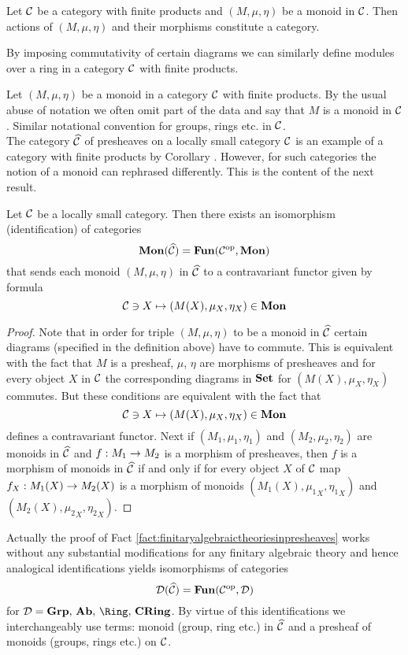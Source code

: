 \begin{remark}
Let ${\mathcal C}$ be a category with finite products and $(M,\mu,\eta)$ be a monoid in ${\mathcal C}$. Then actions of $(M,\mu,\eta)$ and their morphisms constitute a category. 
\end{remark}

\begin{remark}
By imposing commutativity of certain diagrams we can similarly define modules over a ring in a category ${\mathcal C}$ with finite products.
\end{remark}
\noindent
Let $(M,\mu,\eta)$ be a monoid in a category ${\mathcal C}$ with finite products. By the usual abuse of notation we often omit part of the data and say that $M$ is a monoid in ${\mathcal C}$. Similar notational convention for groups, rings etc. in ${\mathcal C}$.\\
The category $\widehat{{\mathcal C}}$ of presheaves on a locally small category ${\mathcal C}$ is an example of a category with finite products by Corollary . However, for such categories the notion of a monoid can rephrased differently. This is the content of the next result.

\begin{fact}\label{fact:finitaryalgebraictheoriesinpresheaves}
Let ${\mathcal C}$ be a locally small category. Then there exists an isomorphism (identification) of categories
$$\mathbf{Mon}(\widehat{{\mathcal C}}) = \mathbf{Fun}({\mathcal C}^{\mathrm{op}},\mathbf{Mon})$$
that sends each monoid $(M,\mu,\eta)$ in $\widehat{{\mathcal C}}$ to a contravariant functor given by formula 
$${\mathcal C}\ni X\mapsto (M(X),\mu_X,\eta_X)\in \mathbf{Mon}$$
\end{fact}
\begin{proof}
Note that in order for triple $(M,\mu,\eta)$ to be a monoid in $\widehat{{\mathcal C}}$ certain diagrams (specified in the definition above) have to commute. This is equivalent with the fact that $M$ is a presheaf, $\mu$, $\eta$ are morphisms of presheaves and for every object $X$ in ${\mathcal C}$ the corresponding diagrams in $\mathbf{Set}$ for $(M(X),\mu_X,\eta_X)$ commutes. But these conditions are equivalent with the fact that 
$${\mathcal C}\ni X\mapsto (M(X),\mu_X,\eta_X)\in \mathbf{Mon}$$
defines a contravariant functor. Next if $(M_1,\mu_1,\eta_1)$ and $(M_2,\mu_2,\eta_2)$ are monoids in $\widehat{{\mathcal C}}$ and $f:M_1\rightarrow M_2$ is a morphism of presheaves, then $f$ is a morphism of monoids in $\widehat{{\mathcal C}}$ if and only if for every object $X$ of ${\mathcal C}$ map $f_X:M_1(X)\rightarrow M_2(X)$ is a morphism of monoids $(M_1(X),{\mu_1}_X,{\eta_1}_X)$ and $(M_2(X),{\mu_2}_X,{\eta_2}_X)$.
\end{proof}

\begin{remark}\label{remark:finitaryalgebraictheoriesinpresheaves}
Actually the proof of Fact \ref{fact:finitaryalgebraictheoriesinpresheaves} works without any substantial modifications for any finitary algebraic theory and hence analogical identifications yields isomorphisms of categories
$${\mathcal D}(\widehat{{\mathcal C}}) = \mathbf{Fun}({\mathcal C}^{\mathrm{op}},{\mathcal D})$$
for $\cD = \Grp,\,\Ab,\,\Ring,\,\CRing$.
By virtue of this identifications we interchangeably use terms: monoid (group, ring etc.) in $\widehat{{\mathcal C}}$ and a presheaf of monoids (groups, rings etc.) on ${\mathcal C}$.
\end{remark}




